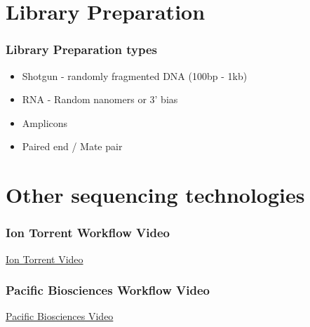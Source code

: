 \documentclass[pdf]{beamer}
\begin{document}
\section{Library Preparation}
\begin{frame}
 \frametitle{Library Preparation types}
 \begin{itemize}
 \item Shotgun - randomly fragmented DNA (100bp - 1kb) 
 \item RNA - Random nanomers or 3' bias
 \item Amplicons
 \item Paired end / Mate pair
 \end{itemize}
\end{frame} 

\section{Other sequencing technologies}
\begin{frame}
  \frametitle{Ion Torrent Workflow Video}
  \begin{center}
  \href{http://www.youtube.com/watch?v=yVf2295JqUg}{Ion Torrent Video}
  \end{center}
\end{frame} 


\begin{frame}
  \frametitle{Pacific Biosciences Workflow Video}
  \begin{center}
  \href{http://www.youtube.com/watch?v=NHCJ8PtYCFc&feature=endscreen&NR=1}{Pacific Biosciences Video}
  \end{center}
\end{frame} 
\end{document}
